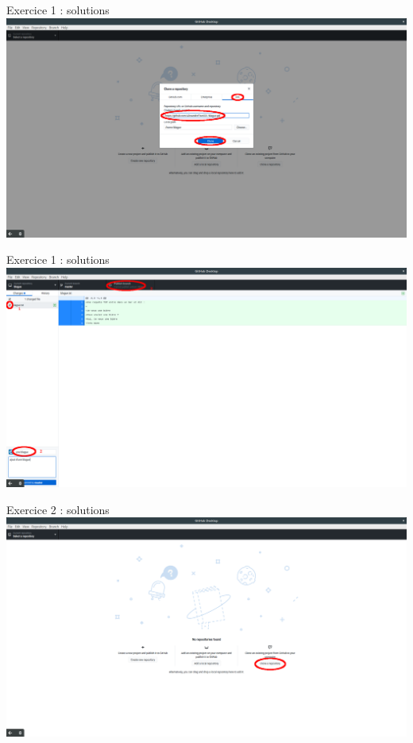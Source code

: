 \documentclass{beamer}
\begin{document}
\begin{frame}{Exercice 1 : solutions}
	\centering
    \includegraphics[scale=0.16]{img/image_exercices/cloning_with_url.png}
\end{frame}

\begin{frame}{Exercice 1 : solutions}
	\centering
    \includegraphics[scale=0.16]{img/image_exercices/add+commit+push_1.png}
\end{frame}

\begin{frame}{Exercice 2 : solutions}
	\centering
    \includegraphics[scale=0.16]{img/image_exercices/clonning_repo.png}
\end{frame}
\end{document}

